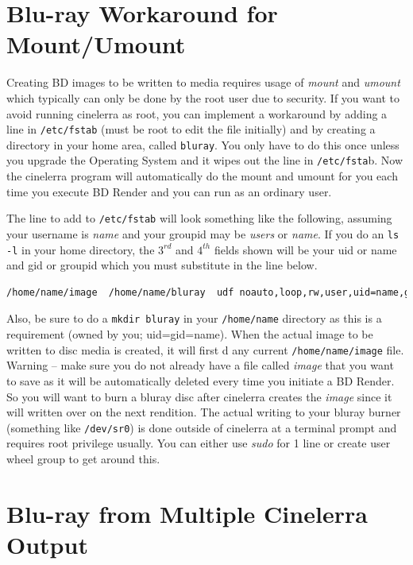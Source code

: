 \section{Blu-ray Workaround for Mount/Umount}%
\label{sec:bluray_workaround_mount_umount}

Creating BD images to be written to media requires usage of \textit{mount} and \textit{umount} which typically can only be done by the root user due to security.  If you want to avoid running cinelerra as root, you can implement a workaround by adding a line in \texttt{/etc/fstab} (must be root to edit the file initially) and by creating a directory in your home area, called \texttt{bluray}.  You only have to do this once unless you upgrade the Operating System and it wipes out the line in \texttt{/etc/fsta}b.  Now the cinelerra program will automatically do the mount and umount for you each time you execute BD Render and you can run as an ordinary user.

The line to add to \texttt{/etc/fstab} will look something like the following, assuming your username is \textit{name} and your groupid may be \textit{users} or \textit{name}.  If you do an \texttt{ls -l} in your home directory, the $3^{rd}$ and $4^{th}$ fields shown will be your uid or name and gid or groupid which you must substitute in the line below.

\begin{lstlisting}[language=bash,numbers=none]
/home/name/image  /home/name/bluray  udf noauto,loop,rw,user,uid=name,gid=groupid 0 0
\end{lstlisting}

Also, be sure to do a \texttt{mkdir bluray} in your \texttt{/home/name} directory as this is a requirement (owned by you; uid=gid=name).  When the actual image to be written to disc media is created, it will first d any current \texttt{/home/name/image} file.  Warning – make sure you do not already have a file called \textit{image} that you want to save as it will be automatically deleted every time you initiate a BD Render.  So you will want to burn a bluray disc after cinelerra creates the \textit{image} since it will written over on the next rendition.  The actual writing to your bluray burner (something like \texttt{/dev/sr0}) is done outside of cinelerra at a terminal prompt and requires root privilege usually.  You can either use \textit{sudo} for 1 line or create user wheel group to get around this.

\section{Blu-ray from Multiple Cinelerra Output}%
\label{sec:bluray_multiple_cinelerra_output}

